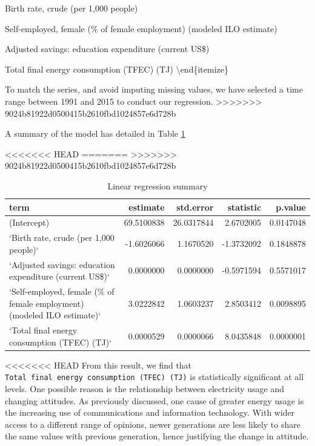 \documentclass[11pt,a4paper,]{article}
\begin{document}
\item

Birth rate, crude (per 1,000 people)

\item

Self-employed, female (\% of female employment) (modeled ILO estimate)

\item

Adjusted savings: education expenditure (current US\$)

\item

Total final energy consumption (TFEC) (TJ)
\textbackslash{}end\{itemize\}

To match the series, and avoid imputing missing values, we have selected a time range between 1991 and 2015 to conduct our regression.
>>>>>>> 9024b81922d0500415b2610fbd1024857e6d728b

A summary of the model has detailed in Table \ref{tab:model-summary}

\begin{table}[!h]

\caption{\label{tab:model-summary}Linear regression summary}
\centering
<<<<<<< HEAD
\fontsize{7}{9}\selectfont
=======
\fontsize{10}{12}\selectfont
>>>>>>> 9024b81922d0500415b2610fbd1024857e6d728b
\begin{tabular}[t]{lrrrr}
\toprule
term & estimate & std.error & statistic & p.value\\
\midrule
(Intercept) & 69.5100838 & 26.0317844 & 2.6702005 & 0.0147048\\
`Birth rate, crude (per 1,000 people)` & -1.6026066 & 1.1670520 & -1.3732092 & 0.1848878\\
`Adjusted savings: education expenditure (current US\$)` & 0.0000000 & 0.0000000 & -0.5971594 & 0.5571017\\
`Self-employed, female (\% of female employment) (modeled ILO estimate)` & 3.0222842 & 1.0603237 & 2.8503412 & 0.0098895\\
`Total final energy consumption (TFEC) (TJ)` & 0.0000529 & 0.0000066 & 8.0435848 & 0.0000001\\
\bottomrule
\end{tabular}
\end{table}

<<<<<<< HEAD
From this result, we find that
\texttt{Total\ final\ energy\ consumption\ (TFEC)\ (TJ)} is
statistically significant at all levels. One possible reason is the
relationship between electricity usage and changing attitudes. As
previously discussed, one cause of greater energy usage is the
increasing use of communications and information technology. With wider
access to a different range of opinions, newer generations are less
likely to share the same values with previous generation, hence
justifying the change in attitude.
\end{document}
